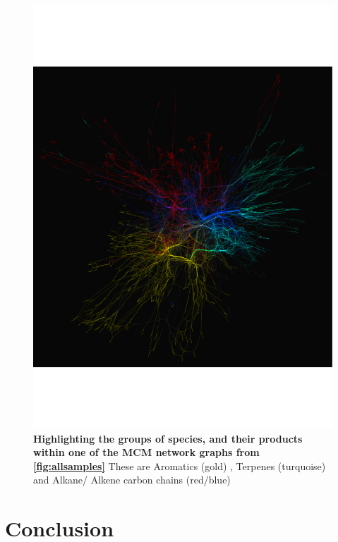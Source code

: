     \begin{figure}[H]
         \centering
    \includegraphics[width=\textwidth,trim={0 4cm 0 4cm},angle=-90]{figures_c1/beijingtest/graphgroups.pdf}
     \caption{\textbf{Highlighting the groups of species, and their products within one of the MCM network graphs from \autoref{fig:allsamples}} These are {\color{DarkGoldenrod} Aromatics (gold)} , {\color{DarkTurquoise} Terpenes (turquoise) } and {\color{OrangeRed} Alkane}/{\color{RoyalBlue} Alkene  } carbon chains (red/blue)}
     \label{fig:fncolour}
     \end{figure}





\section{Conclusion}

